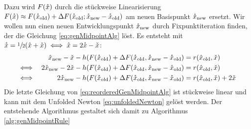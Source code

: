 Dazu wird $F(\mathring{x})$ durch die stückweise Linearisierung $F(\mathring{x})\approx F(\mathring{x}_{\text{old}})+\Delta F(\mathring{x}_{\text{old}};\mathring{x}_{\text{new}} -\mathring{x}_{\text{old}} )$ am neuen Basispunkt $\mathring{x}_{\text{new}}$ ersetzt. 
Wir wollen nun einen neuen Entwicklungspunkt $\mathring{x}_{\text{new}}$ durch Fixpunktiteration finden, der die Gleichung \eqref{eq:genMidpointAlg} löst. 
Es entsteht mit $\mathring{x} = \sfrac{1}{2} (\hat x + \check x) \iff \hat x = 2\mathring{x} - \check x$:
\begin{equation}
\label{eq:reorderedGenMidpointAlg}
 \begin{aligned}
		 && \hat x_{\text{new}} - \check x - h (F(\mathring{x}_{\text{old}}) +\Delta F(\mathring{x}_{\text{old}},\mathring{x}_{\text{new}} - \mathring{x}_{\text{old}}) &= r(\hat x_{\text{old}},\check x)\\
 \iff && 2\mathring{x}_{\text{new}} - 2\check x - h (F(\mathring{x}_{\text{old}}) +\Delta F(\mathring{x}_{\text{old}},\mathring{x}_{\text{new}} - \mathring{x}_{\text{old}}) &= r(\hat x_{\text{old}},\check x)\\
 \iff && 2\mathring{x}_{\text{new}} -  h (F(\mathring{x}_{\text{old}}) +\Delta F(\mathring{x}_{\text{old}},\mathring{x}_{\text{new}} - \mathring{x}_{\text{old}}) &= r(\hat x_{\text{old}},\check x) + 2\check x
 \end{aligned}
\end{equation}
Die letzte Gleichung von \eqref{eq:reorderedGenMidpointAlg} ist stückweise linear und kann mit dem Unfolded Newton \eqref{eq:unfoldedNewton} gelöst werden. Der entstehende Algorithmus gestaltet sich damit zu Algorithmus \ref{alg:genMidpointRule}


